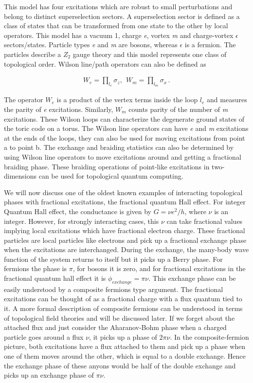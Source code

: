 This model has four excitations which are robust to small perturbations and belong to distinct superselection sectors. A superselection sector is defined as a class of states that can be transformed from one state to the other by local operators. This model has a vacuum 1, charge \textit{e}, vortex \textit{m} and charge-vortex \textit{$\epsilon$} sectors/states. Particle types \textit{e} and \textit{m} are bosons, whereas \textit{$\epsilon$} is a fermion. The particles describe a $Z_2$ gauge theory and this model represents one class of topological order. Wilson line/path operators can also be defined as

\begin{align}
W_e = \prod_{l_e} \sigma_z,~~ W_m = \prod_{l_m} \sigma_x \,.
\label{Wilsonline}
\end{align}

The operator $W_e$ is a product of the vertex terms inside the loop $l_e$ and measures the parity of \textit{e} excitations. Similarly, $W_m$ counts parity of the number of \textit{m} excitations. These Wilson loops can characterize the degenerate ground states of the toric code on a torus. The Wilson line operators can have \textit{e} and \textit{m} excitations at the ends of the loops, they can also be used for moving excitations from point a to point b. The exchange and braiding statistics can also be determined by using Wilson line operators to move excitations around and getting a fractional braiding phase. These braiding operations of point-like excitations in two-dimensions can be used for topological quantum computing. 

We will now discuss one of the oldest known examples of interacting topological phases with fractional excitations, the fractional quantum Hall effect. For integer Quantum Hall effect, the conductance is given by $G = \nu e^2/h$, where $\nu$ is an integer. However, for strongly interacting cases, this $\nu$ can take fractional values implying local excitations which have fractional electron charge. These fractional particles are local particles like electrons and pick up a fractional exchange phase when the excitations are interchanged. During the exchange, the many-body wave function of the system returns to itself but it picks up a Berry phase. For fermions the phase is $\pi$, for bosons it is zero, and for fractional excitations in the fractional quantum hall effect it is $\phi_{exchange} = \pi \nu$. This exchange phase can be easily understood by a composite fermions type argument. The fractional excitations can be thought of as a fractional charge with a flux quantum tied to it. A more formal description of composite fermions can be understood in terms of topological field theories and will be discussed later. If we forget about the attached flux and just consider the Aharanov-Bohm phase when a charged particle goes around a flux $\nu$, it picks up a phase of $2 \pi \nu$. In the composite-fermion picture, both excitations have a flux attached to them and pick up a phase when one of them moves around the other, which is equal to a double exchange. Hence the exchange phase of these anyons would be half of the double exchange and picks up an exchange phase of $ \pi \nu$. 

